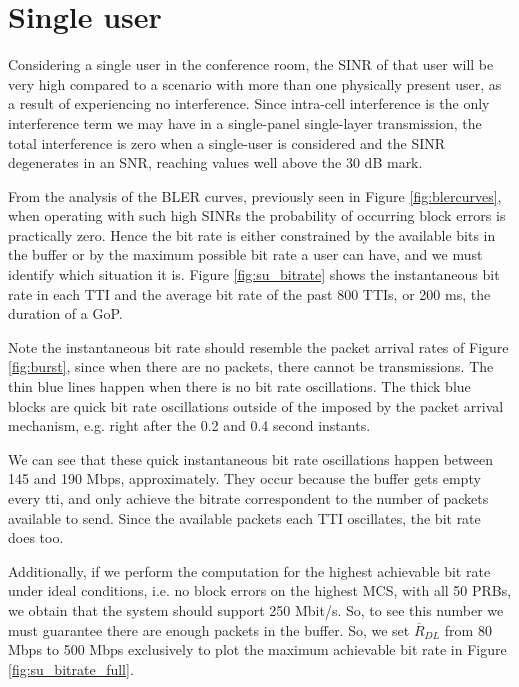 \section{Single user} \label{sec:single-user}

Considering a single user in the conference room, the SINR of that user will be very high compared to a scenario with more than one physically present user, as a result of experiencing no interference. Since intra-cell interference is the only interference term we may have in a single-panel single-layer transmission, the total interference is zero when a single-user is considered and the SINR degenerates in an SNR, reaching values well above the 30 dB mark.

From the analysis of the BLER curves, previously seen in Figure \ref{fig:blercurves}, when operating with such high SINRs the probability of occurring block errors is practically zero. Hence the bit rate is either constrained by the available bits in the buffer or by the maximum possible bit rate a user can have, and we must identify which situation it is. Figure \ref{fig:su_bitrate} shows the instantaneous bit rate in each TTI and the average bit rate of the past 800 TTIs, or 200 ms, the duration of a \ac{GoP}.


Note the instantaneous bit rate should resemble the packet arrival rates of Figure \ref{fig:burst}, since when there are no packets, there cannot be transmissions. The thin blue lines happen when there is no bit rate oscillations. The thick blue blocks are quick bit rate oscillations outside of the imposed by the packet arrival mechanism, e.g. right after the 0.2 and 0.4 second instants. 

We can see that these quick instantaneous bit rate oscillations happen between 145 and 190 Mbps, approximately. They occur because the buffer gets empty every tti, and only achieve the bitrate correspondent to the number of packets available to send. Since the available packets each TTI oscillates, the bit rate does too. 

Additionally, if we perform the computation for the highest achievable bit rate under ideal conditions, i.e. no block errors on the highest \acs{MCS}, with all 50 \acsp{PRB}, we obtain that the system should support 250 Mbit/s. So, to see this number we must guarantee there are enough packets in the buffer. So, we set $\overline{R}_{DL}$ from 80 Mbps to 500 Mbps exclusively to plot the maximum achievable bit rate in Figure \ref{fig:su_bitrate_full}. 

